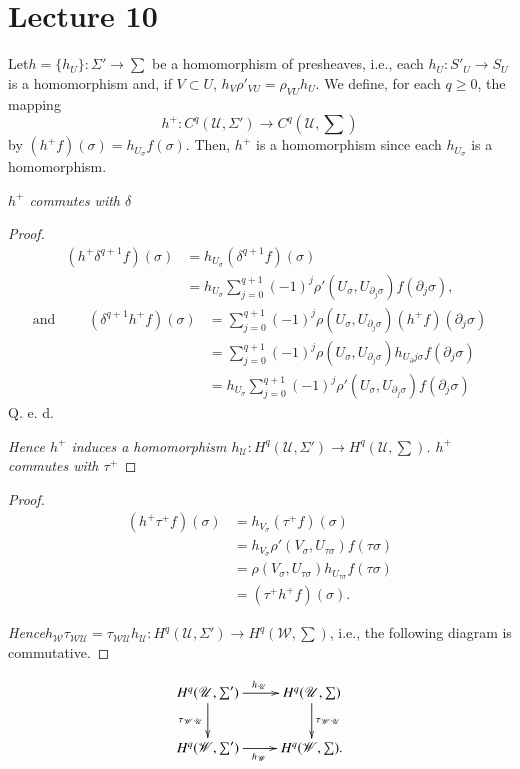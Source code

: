 \chapter{Lecture 10}

Let\pageoriginale $h = \{ h_U \} : \Sigma' \to \sum$ be a homomorphism of
presheaves, i.e., each $h_U : S'_U \to S_U$ is a homomorphism and, if
$V \subset U$, $h_V \rho'_{VU} = \rho_{VU} h_U$. We define, for each
$q\ge0$, the mapping  
$$
h^+ : C^q (\mathscr{U}, \Sigma') \to C^q (\mathscr{U}, \sum) 
$$
by $(h^+ f) (\sigma) = h_{U_\sigma} f(\sigma)$. Then, $h^+$ is a
homomorphism since each $h_{U_\sigma}$ is a homomorphism.  

\textit{$h^+$ commutes with $\delta$} 

\begin{proof}%
\begin{align*}
(h^+ \delta^{q+1} f) (\sigma) & = h_{U_\sigma} (\delta^{q+1} f) (\sigma)\\
& = h_{U_\sigma} \sum^{q+1}_{j=0} (-1)^j \rho' (U_\sigma ,
  U_{\partial_j \sigma}) f(\partial_j \sigma), 
\end{align*}
\begin{align*}
\text{and }\qquad  (\delta^{q+1} h^+ f) (\sigma) & = \sum^{q+1}_{j=0}
(-1)^j \rho(U_\sigma , U_{\partial_j \sigma}) (h^+ f) (\partial_j
\sigma)\\ 
& = \sum^{q+1}_{j=0} (-1)^j \rho(U_\sigma , U_{\partial_j \sigma})
h_{U_\partial j \sigma } f(\partial_j \sigma)\\ 
& = h_{U_\sigma} \sum^{q+1}_{j=0} (-1)^j \rho' (U_\sigma ,
U_{\partial_j \sigma}) f(\partial_j \sigma) 
\end{align*}
\hfill Q. e. d.

\noindent
\textit{Hence $h^+$ induces a homomorphism $h_{\mathscr{U}} : H^q
  (\mathscr{U}, \Sigma') \to H^q (\mathscr{U}, \sum)$. $h^+$ commutes
  with $\tau^+$} 
\end{proof}

\begin{proof}%
\begin{align*}
(h^+ \tau^+ f) (\sigma ) & = h_{V_\sigma} (\tau^+ f) (\sigma )\\
& = h_{V_\sigma} \rho' (V_\sigma , U_{\tau \sigma}) f(\tau \sigma )\\
& = \rho (V_{\sigma}, U_{\tau \sigma}) h_{U_{\tau \sigma}} f(\tau \sigma )\\
& = (\tau^+ h^+ f) (\sigma).
\end{align*}

\textit{Hence}\pageoriginale $h_{\mathscr{W}} \tau_{\mathscr{W} \mathscr{U}} =
\tau_{\mathscr{W} \mathscr{U}} h_{\mathscr{U}} : H^q (\mathscr{U},
\Sigma') \to H^q (\mathscr{W}, \sum)$, i.e., the following diagram is
commutative. 
\end{proof}
\[
\xymatrix{
H^q(\mathscr{U}, \sum') \ar[r]^{h_{\mathscr{U}}}
\ar[d]_{\tau_{\mathscr{W}\mathscr{U}}} &
H^q(\mathscr{U},\sum)\ar[d]^{\tau_{\mathscr{W}\mathscr{U}}}\\
H^q (\mathscr{W}, \sum') \ar[r]_{h_{\mathscr{W}}} & H^q(\mathscr{W},\sum).
}
\]

